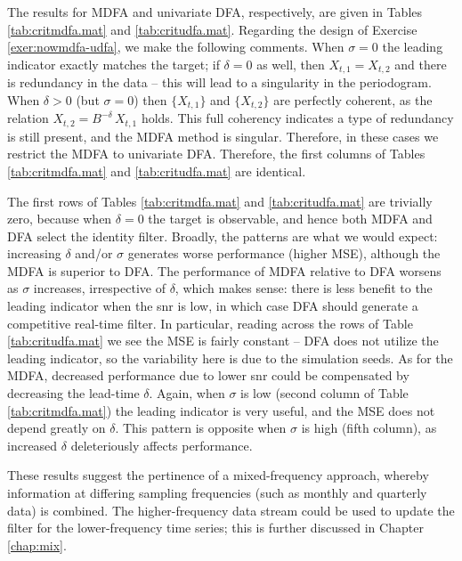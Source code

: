 \documentclass[a4paper]{book}
\begin{document}
 The results for MDFA and univariate DFA, respectively, are given in 
Tables \ref{tab:critmdfa.mat} and \ref{tab:critudfa.mat}.
Regarding the design of Exercise \ref{exer:nowmdfa-udfa}, we make the following 
comments.  When $\sigma = 0$ the leading indicator exactly matches the target;
 if $\delta = 0$ as well, then $X_{t,1} = X_{t,2}$ and there is redundancy in
 the data -- this will lead to a singularity in the periodogram.  When 
 $\delta > 0$ (but $\sigma = 0$) then $\{ X_{t,1} \}$ and $\{ X_{t,2} \}$
 are perfectly coherent, as the relation $X_{t,2} = B^{-\delta} \, X_{t,1}$ holds.
 This full coherency indicates a type of redundancy is still present,
 and the MDFA method is singular.  Therefore, in these cases we restrict
 the MDFA to univariate DFA.  Therefore, the first columns of 
 Tables \ref{tab:critmdfa.mat} and \ref{tab:critudfa.mat} are identical.

 The first rows of Tables \ref{tab:critmdfa.mat} and \ref{tab:critudfa.mat}
 are trivially zero, because when $\delta = 0$ the target is observable,
 and hence both MDFA and DFA select the identity filter.  
 Broadly, the patterns are what we would expect: increasing $\delta$ and/or
 $\sigma$ generates worse performance (higher MSE), although the MDFA is
 superior to DFA.  The performance of MDFA relative to DFA worsens as 
 $\sigma$ increases, irrespective of $\delta$, which makes sense: there
 is less benefit to the leading indicator when the snr is low, in which
 case DFA should generate a competitive real-time filter.
  In particular, reading across the rows of Table \ref{tab:critudfa.mat}
 we see the MSE is fairly constant -- DFA does not utilize the leading indicator,
 so the variability here is due to the simulation seeds.
  As for the MDFA, decreased performance due to lower snr could be 
 compensated by decreasing the lead-time $\delta$.  
  Again, when $\sigma$ is low (second column of Table \ref{tab:critmdfa.mat})
  the leading indicator is very useful, and the MSE does not depend 
 greatly on $\delta$.  This pattern is opposite when $\sigma$ is high 
 (fifth column), as increased $\delta$ deleteriously affects performance.

   
These results suggest the pertinence of a mixed-frequency approach,
 whereby information at differing sampling frequencies (such as monthly
 and quarterly data) is combined.  The higher-frequency data stream
 could be used to update the filter for the lower-frequency time series;
 this is further discussed in Chapter \ref{chap:mix}. 
 
\end{document}
